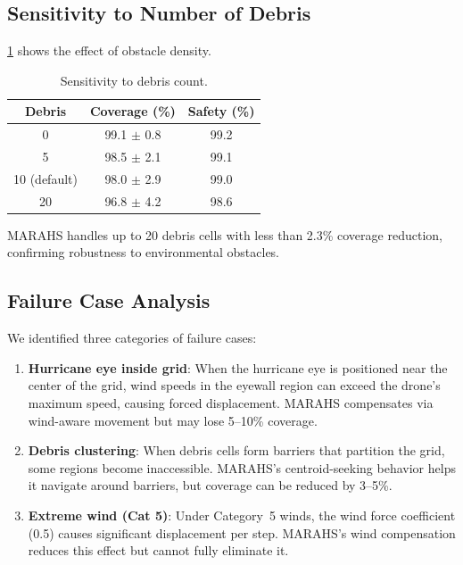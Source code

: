 \documentclass[11pt,twocolumn]{article}
\providecommand{\Cref}[1]{\ref{#1}}
\theoremstyle{definition}
\begin{document}
\subsection{Sensitivity to Number of Debris}

\Cref{tab:sensitivity_debris} shows the effect of obstacle density.

\begin{table}[h]
\centering
\caption{Sensitivity to debris count.}
\label{tab:sensitivity_debris}
\small
\begin{tabular}{ccc}
\toprule
\textbf{Debris} & \textbf{Coverage (\%)} & \textbf{Safety (\%)} \\
\midrule
0 & 99.1 $\pm$ 0.8 & 99.2 \\
5 & 98.5 $\pm$ 2.1 & 99.1 \\
10 (default) & 98.0 $\pm$ 2.9 & 99.0 \\
20 & 96.8 $\pm$ 4.2 & 98.6 \\
\bottomrule
\end{tabular}
\end{table}

MARAHS handles up to 20 debris cells with less than 2.3\% coverage reduction, confirming robustness to environmental obstacles.

\subsection{Failure Case Analysis}

We identified three categories of failure cases:

\begin{enumerate}[leftmargin=*]
    \item \textbf{Hurricane eye inside grid}: When the hurricane eye is positioned near the center of the grid, wind speeds in the eyewall region can exceed the drone's maximum speed, causing forced displacement. MARAHS compensates via wind-aware movement but may lose 5--10\% coverage.
    
    \item \textbf{Debris clustering}: When debris cells form barriers that partition the grid, some regions become inaccessible. MARAHS's centroid-seeking behavior helps it navigate around barriers, but coverage can be reduced by 3--5\%.
    
    \item \textbf{Extreme wind (Cat 5)}: Under Category~5 winds, the wind force coefficient (0.5) causes significant displacement per step. MARAHS's wind compensation reduces this effect but cannot fully eliminate it.
\end{enumerate}
\end{document}
